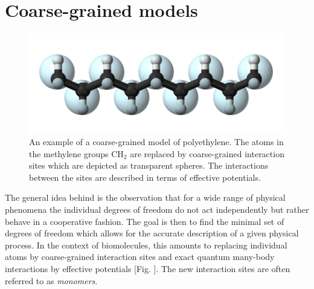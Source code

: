 \documentclass[12pt]{report}
\begin{document}
\section{Coarse-grained models}
%
\begin{figure}
\center
\includegraphics[width = 0.99\textwidth]{chapter4Figs/coarseGraining.png}
\caption{\label{fig:coarseGraining}%
An example of a coarse-grained model of polyethylene. The atoms in the methylene groups $\mathrm{CH}_{2}$ are replaced by coarse-grained interaction sites which are depicted as transparent spheres. The interactions between the sites are described in terms of effective potentials.
}
\end{figure}
% 
The general idea behind  is the observation that for a wide range of physical phenomena the individual degrees of freedom do not act independently but rather behave in a cooperative fashion. The goal is then to find the minimal set of degrees of freedom which allows for the accurate description of a given physical process. In the context of biomolecules, this amounts to replacing individual atoms by coarse-grained interaction sites and exact quantum many-body interactions by effective potentials [Fig. ]. The new interaction sites are often referred to as \textit{monomers}. 
\end{document}
